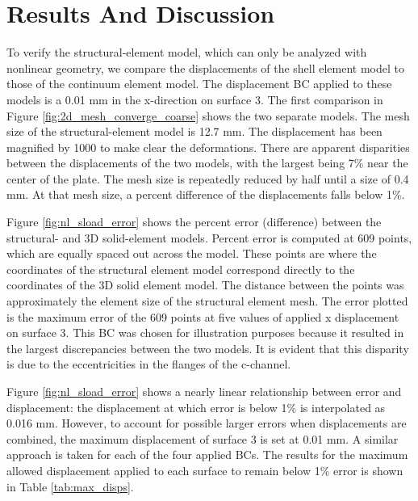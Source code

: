 
\chapter{Results And Discussion}\label{results}

To verify the structural-element model, which can only be analyzed with nonlinear geometry, we
compare the displacements of the shell element model to those of the continuum
element model. The displacement BC applied to these models is a 0.01 mm in the
x-direction on surface 3. The first comparison in Figure
\ref{fig:2d_mesh_converge_coarse} shows the two separate models.  The mesh size
of the structural-element model is 12.7 mm. The displacement has been magnified
by 1000 to make clear the deformations. There are apparent disparities between the
displacements of the two models, with the largest being 7\% near the center of
the plate. The mesh size is repeatedly reduced by half until a size of 0.4 mm.
At that mesh size, a percent difference of the displacements falls below 1\%.  

Figure \ref{fig:nl_sload_error} shows the percent error (difference) between the
structural- and 3D solid-element models.  Percent error is computed at 609
points, which are equally spaced out across the model. These points are where the coordinates of the structural element model correspond directly to the coordinates of the 3D solid element model. The distance between the points was approximately the element size of the structural element mesh. The error plotted is the maximum error of the 609 points at
five values of applied x displacement on surface 3.  This BC was chosen for
illustration purposes because it resulted in the largest discrepancies between
the two models.  It is evident that this disparity is due to the eccentricities
in the flanges of the c-channel.

Figure \ref{fig:nl_sload_error} shows a nearly linear relationship between error
and displacement:  the displacement at which error is below 1\% is interpolated
as 0.016 mm. However, to account for possible larger errors when displacements
are combined, the maximum displacement of surface 3 is set at 0.01 mm. A similar
approach is taken for each of the four applied BCs. The results for the maximum allowed
displacement applied to each surface to remain below 1\% error is shown in Table
\ref{tab:max_disps}. 


